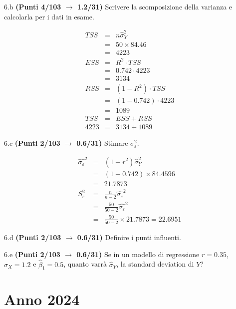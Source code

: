 \documentclass[
  11pt,
]{book}
\theoremstyle{mytheoremstyle}
\theoremstyle{mydefstyle}
\newenvironment{sol}
  {
  \begin{tcolorbox}[enhanced,breakable,arc=0.1mm,boxrule=1pt,colback=white,colframe=iblue,
  title=\bf \fontfamily{lmss}\selectfont \hspace{.5 cm} Soluzione,drop fuzzy shadow]

}{
\end{tcolorbox}
  }
\begin{document}
6.b \textbf{(Punti 4/103 \(\rightarrow\) 1.2/31)} Scrivere la scomposizione della varianza e calcolarla per i dati in esame.

\begin{sol}
\begin{eqnarray*}
   TSS &=& n\hat\sigma^2_Y\\
      &=& 50 \times 84.46 \\
      &=&  4223 \\
   ESS &=& R^2\cdot TSS\\
      &=&  0.742 \cdot 4223 \\
      &=& 3134 \\
   RSS &=& (1-R^2)\cdot TSS\\
      &=& (1- 0.742 )\cdot 4223 \\
      &=&  1089 \\
   TSS &=& ESS+RSS \\ 4223  &=&  3134 + 1089 
  \end{eqnarray*}

\end{sol}

6.c \textbf{(Punti 2/103 \(\rightarrow\) 0.6/31)} Stimare \(\sigma^2_\varepsilon\).

\begin{sol}
\begin{eqnarray*}
\hat{\sigma_\varepsilon}^2&=&(1-r^2)\hat\sigma_Y^2\\
&=& (1-0.742)\times84.4596\\
    &=& 21.7873\\
    S_\varepsilon^2 &=& \frac{n} {n-2} \hat{\sigma_\varepsilon}^2\\
    &=&  \frac{50} {50-2} \hat{\sigma_\varepsilon}^2 \\
 &=&  \frac{50} {50-2} \times 21.7873 = 22.6951 
\end{eqnarray*}

\end{sol}

6.d \textbf{(Punti 2/103 \(\rightarrow\) 0.6/31)} Definire i punti influenti.

6.e \textbf{(Punti 2/103 \(\rightarrow\) 0.6/31)} Se in un modello di regressione \(r=0.35\), \(\hat\sigma_X=1.2\) e \(\hat\beta_1=0.5\), quanto varrà
\(\hat\sigma_Y\), la standard deviation di \(Y\)?

\chapter{Anno 2024}\label{anno-2024}
\end{document}
